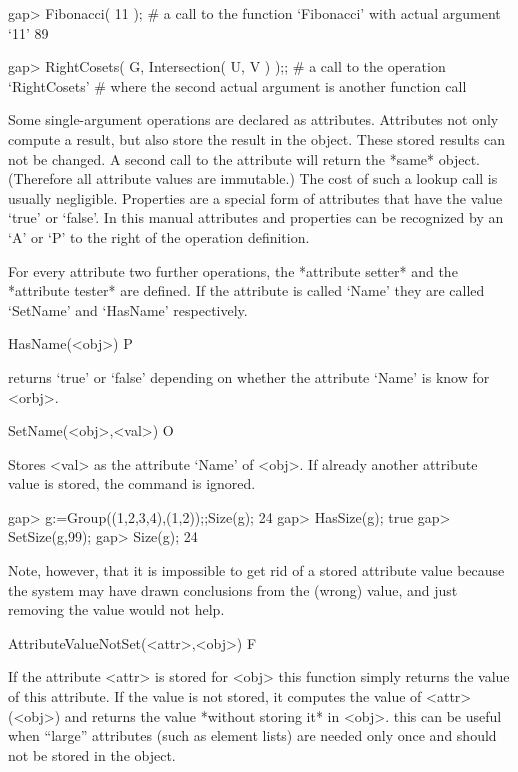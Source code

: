 \beginexample
gap> Fibonacci( 11 );
  # a call to the function `Fibonacci' with actual argument `11'
89
\endexample

\begintt
gap> RightCosets( G, Intersection( U, V ) );;
  # a call to the operation `RightCosets'
  # where the second actual argument is another function call
\endtt


Some single-argument operations are declared as attributes. Attributes not
only compute a result, but also store the result in the object. These stored
results can not be changed. A second call to the attribute will return the
*same* object. (Therefore all attribute values are immutable.) The cost of
such a lookup call is usually negligible.
Properties are a special form of attributes that have the value `true' or
`false'.
In this manual attributes and properties can be recognized by an `A' or `P'
to the right of the operation definition.

For every attribute two further operations, the *attribute setter* and the
*attribute tester* are defined. If the attribute is called `Name' they are
called `SetName' and `HasName' respectively. 

\>HasName(<obj>) P

returns `true' or `false' depending on whether the attribute `Name' is know
for <orbj>.

\>SetName(<obj>,<val>) O

Stores <val> as the attribute `Name' of <obj>. If already another attribute
value is stored, the command is ignored.

\beginexample
gap> g:=Group((1,2,3,4),(1,2));;Size(g);
24
gap> HasSize(g);
true
gap> SetSize(g,99);
gap> Size(g);
24
\endexample

Note, however, that it is impossible to get rid of a stored attribute
value because the system may have drawn conclusions from the (wrong)
value, and just removing the value would not help.

\>AttributeValueNotSet(<attr>,<obj>) F

If the attribute <attr> is stored for <obj> this function simply returns the
value of this attribute. If the value is not stored, it computes the value
of <attr>(<obj>) and returns the value *without storing it* in <obj>. this
can be useful when ``large'' attributes (such as element lists)
are needed only once and should not be stored in the object.

